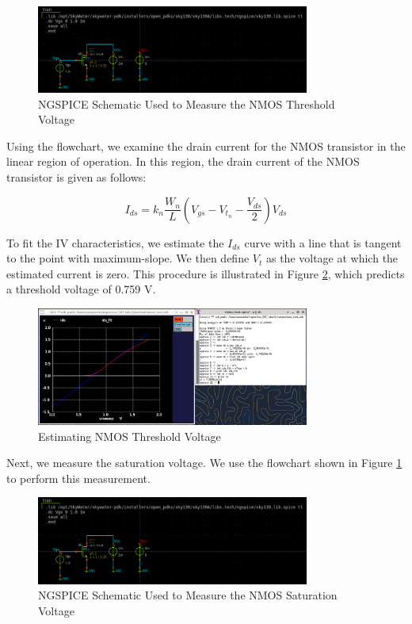 \documentclass[fleqn]{article}
\begin{document}
	\begin{figure}[H]
		\centerline{\includegraphics[width=0.8\textwidth]{nmos_vt_meas_schem.png}}
		\caption{NGSPICE Schematic Used to Measure the NMOS Threshold Voltage}
		\label{fig::nmos_vt_meas_schem}
	\end{figure}
	
	\noindent Using the flowchart, we examine the drain current for the NMOS transistor in the linear region of operation. In this region, the drain current of the NMOS transistor is given as follows:
	
	\begin{equation}
		I_{ds} = k_n\frac{W_n}{L}\left(V_{gs} - V_{t_n} - \frac{V_{ds}}{2}\right)V_{ds}
	\end{equation}
	
	\noindent To fit the IV characteristics, we estimate the $I_{ds}$ curve with a line that is tangent to the point with maximum-slope. We then define $V_t$ as the voltage at which the estimated current is zero. This procedure is illustrated in Figure \ref{fig::nmos_vt_meas}, which predicts a threshold voltage of 0.759 V.
	
	\begin{figure}[H]
		\centerline{\includegraphics[width=0.8\textwidth]{nmos_vt_meas.png}}
		\caption{Estimating NMOS Threshold Voltage}
		\label{fig::nmos_vt_meas}
	\end{figure}
	
	Next, we measure the saturation voltage. We use the flowchart shown in Figure \ref{fig::nmos_vt_meas_schem} to perform this measurement.
	
	\begin{figure}[H]
		\centerline{\includegraphics[width=0.8\textwidth]{nmos_vt_meas_schem.png}}
		\caption{NGSPICE Schematic Used to Measure the NMOS Saturation Voltage}
		\label{fig::nmos_vdsat_meas_schem}
	\end{figure}
	
\end{document}
